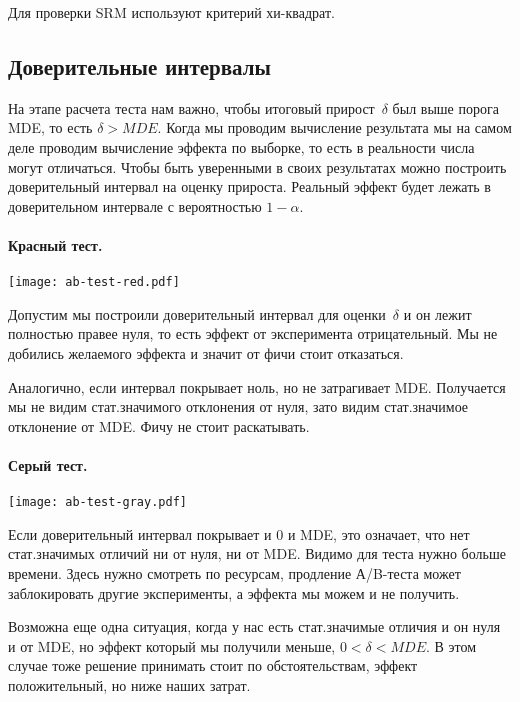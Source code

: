 \documentclass[../handbook.tex]{subfiles}
\begin{document}
Для проверки SRM используют критерий хи-квадрат.

\subsection{Доверительные интервалы}
На этапе расчета теста нам важно, чтобы итоговый прирост~$\delta$ был выше
порога MDE, то есть $\delta > MDE$. Когда мы проводим вычисление результата мы на самом деле проводим
вычисление эффекта по выборке, то есть в реальности числа могут отличаться.
Чтобы быть уверенными в своих результатах можно построить доверительный
интервал на оценку прироста. Реальный эффект будет лежать в доверительном интервале с вероятностью $1 - \alpha$.

\paragraph{Красный тест.}
\begin{marginfigure}
    \texttt{[image: ab-test-red.pdf]}
\end{marginfigure}
Допустим мы построили доверительный интервал для оценки~$\delta$ и он лежит
полностью правее нуля, то есть эффект от эксперимента отрицательный. Мы не
добились желаемого эффекта и значит от фичи стоит отказаться.

Аналогично, если интервал покрывает ноль, но не затрагивает MDE. Получается мы
не видим стат.значимого отклонения от нуля, зато видим стат.значимое отклонение
от MDE. Фичу не стоит раскатывать.

\paragraph{Серый тест.}
\begin{marginfigure}
    \texttt{[image: ab-test-gray.pdf]}
\end{marginfigure}
Если доверительный интервал покрывает и 0 и MDE, это означает, что нет
стат.значимых отличий ни от нуля, ни от MDE. Видимо для теста нужно больше
времени. Здесь нужно смотреть по ресурсам, продление А/B-теста может
заблокировать другие эксперименты, а эффекта мы можем и не получить.

Возможна еще одна ситуация, когда у нас есть стат.значимые отличия и он нуля и
от MDE, но эффект который мы получили меньше, $0 < \delta < MDE$. В этом случае
тоже решение принимать стоит по обстоятельствам, эффект положительный, но ниже
наших затрат.
\end{document}
